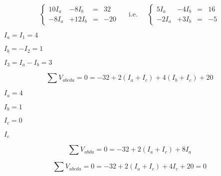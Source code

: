 {\newpage\clearpage
{}%
\begin{displaymath}
    \left\{ \begin{array}{rrrr} 10I_a&-8I_b&=&32 \\-8I_a &+12I_b&=&-20
    \end{array} \right. 
    \;\;\;\;\;\mbox{i.e.}\;\;\;\;\;
    \left\{ \begin{array}{rrrr} 5I_a&-4I_b&=&16 \\-2I_a &+3I_b&=&-5
    \end{array} \right. 
    \end{displaymath}%
\lthtmldisplayZ
\lthtmlcheckvsize\clearpage}

{\newpage\clearpage
{}%
$I_a=I_1=4$%
\lthtmlinlinemathZ
\lthtmlcheckvsize\clearpage}

{\newpage\clearpage
{}%
$I_b=-I_2=1$%
\lthtmlinlinemathZ
\lthtmlcheckvsize\clearpage}

{\newpage\clearpage
{}%
$I_3=I_a-I_b=3$%
\lthtmlinlinemathZ
\lthtmlcheckvsize\clearpage}

{\newpage\clearpage
{}%
\begin{displaymath} 
    \sum V_{abcda}=0=-32+2(I_a+I_c)+4(I_b+I_c)+20 
    \end{displaymath}%
\lthtmldisplayZ
\lthtmlcheckvsize\clearpage}

{\newpage\clearpage
{}%
$I_a=4$%
\lthtmlinlinemathZ
\lthtmlcheckvsize\clearpage}

{\newpage\clearpage
{}%
$I_b=1$%
\lthtmlinlinemathZ
\lthtmlcheckvsize\clearpage}

{\newpage\clearpage
{}%
$I_c=0$%
\lthtmlinlinemathZ
\lthtmlcheckvsize\clearpage}

{\newpage\clearpage
{}%
$I_c$%
\lthtmlinlinemathZ
\lthtmlcheckvsize\clearpage}

{\newpage\clearpage
{}%
\begin{displaymath} \sum V_{abda} =0=-32+2(I_a+I_c)+8I_a   \end{displaymath}%
\lthtmldisplayZ
\lthtmlcheckvsize\clearpage}

{\newpage\clearpage
{}%
\begin{displaymath} \sum V_{abcda}=0=-32+2(I_a+I_c)+4I_c+20=0  \end{displaymath}%
\lthtmldisplayZ
\lthtmlcheckvsize\clearpage}

